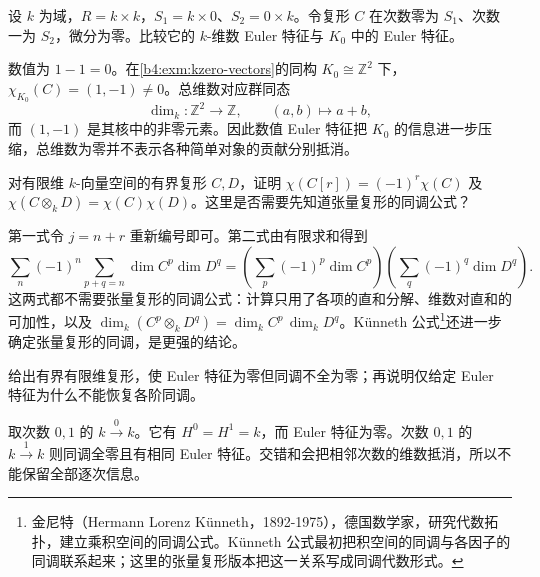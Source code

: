 \begin{exercise}\label{b4:ex:05-kzero-more-than-dimension}
	设 \(k\) 为域，\(R=k\times k\)，\(S_1=k\times0\)、\(S_2=0\times k\)。令复形 \(C\) 在次数零为 \(S_1\)、次数一为 \(S_2\)，微分为零。比较它的 \(k\)-维数 Euler 特征与 \(K_0\) 中的 Euler 特征。
\end{exercise}
\begin{solution}
	数值为 \(1-1=0\)。在\cref{b4:exm:kzero-vectors}的同构 \(K_0\cong\mathbb Z^2\) 下，\(\chi_{K_0}(C)=(1,-1)\ne0\)。总维数对应群同态
	\[
		\dim_k:\mathbb Z^2\longrightarrow\mathbb Z, \qquad(a,b)\longmapsto a+b,
	\]
	而 \((1,-1)\) 是其核中的非零元素。因此数值 Euler 特征把 \(K_0\) 的信息进一步压缩，总维数为零并不表示各种简单对象的贡献分别抵消。
\end{solution}

\begin{exercise}\label{b4:ex:05-euler-shift-tensor}
	对有限维 \(k\)-向量空间的有界复形 \(C,D\)，证明 \(\chi(C[r])=(-1)^r\chi(C)\) 及 \(\chi(C\otimes_kD)=\chi(C)\chi(D)\)。这里是否需要先知道张量复形的同调公式？
\end{exercise}
\begin{solution}
	第一式令 \(j=n+r\) 重新编号即可。第二式由有限求和得到
	\[
		\sum_n(-1)^n\sum_{p+q=n}\dim C^p\dim D^q =\left(\sum_p(-1)^p\dim C^p\right) \left(\sum_q(-1)^q\dim D^q\right).
	\]
	这两式都不需要张量复形的同调公式：计算只用了各项的直和分解、维数对直和的可加性，以及 \(\dim_k(C^p\otimes_kD^q)=\dim_k C^p\,\dim_k D^q\)。Künneth 公式\footnote{金尼特（Hermann Lorenz Künneth，1892-1975），德国数学家，研究代数拓扑，建立乘积空间的同调公式。Künneth 公式最初把积空间的同调与各因子的同调联系起来；这里的张量复形版本把这一关系写成同调代数形式。}还进一步确定张量复形的同调，是更强的结论。
\end{solution}

\begin{exercise}\label{b4:ex:05-euler-zero-insufficient}
	给出有界有限维复形，使 Euler 特征为零但同调不全为零；再说明仅给定 Euler 特征为什么不能恢复各阶同调。
\end{exercise}
\begin{solution}
	取次数 \(0,1\) 的 \(k\xrightarrow0k\)。它有 \(H^0=H^1=k\)，而 Euler 特征为零。次数 \(0,1\) 的 \(k\xrightarrow1k\) 则同调全零且有相同 Euler 特征。交错和会把相邻次数的维数抵消，所以不能保留全部逐次信息。
\end{solution}

